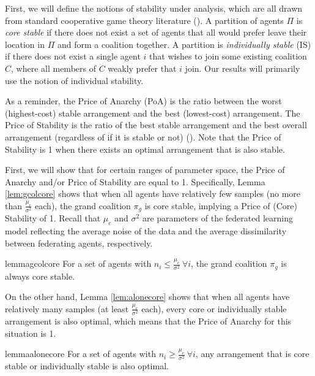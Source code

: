 \documentclass{article}
\newcommand{\mue}[0]{\ensuremath{\mu_e}}
\newcommand{\var}[0]{\ensuremath{\sigma^2}}
\newcommand{\ndraw}[0]{\ensuremath{n}}
\newcommand{\gcol}[0]{\ensuremath{\pi_g}}
\newcommand{\col}[0]{\ensuremath{C}}
\newcommand{\partition}[0]{\ensuremath{\Pi}}
\begin{document}
First, we will define the notions of stability under analysis, which are all drawn from standard cooperative game theory literature (\cite{BOGOMOLNAIA2002201}). A partition of agents $\partition$ is \emph{core stable} if there does not exist a set of agents that all would prefer leave their location in $\partition$ and form a coalition together. A partition is \emph{individually stable} (IS) if there does not exist a single agent $i$ that wishes to join some existing coalition $\col$, where all members of $\col$ weakly prefer that $i$ join. Our results will primarily use the notion of individual stability. %

As a reminder, the Price of Anarchy (PoA) is the ratio between the worst (highest-cost) stable arrangement and the best (lowest-cost) arrangement. The Price of Stability is the ratio of the best stable arrangement and the best overall arrangement (regardless of if it is stable or not) (\cite{anshelevich2008price}). Note that the Price of Stability is 1 when there exists an optimal arrangement that is also stable. 

First, we will show that for certain ranges of parameter space, the Price of Anarchy and/or Price of Stability are equal to 1. Specifically, Lemma \ref{lem:gcolcore} shows that when all agents have relatively few samples (no more than $\frac{\mue}{\var}$ each), the grand coalition $\gcol$ is core stable, implying a Price of (Core) Stability of 1. Recall that $\mue$ and $\var$ are parameters of the federated learning model reflecting the average noise of the data and the average dissimilarity between federating agents, respectively. 

\begin{restatable}{lemma}{gcolcore}
\label{lem:gcolcore}
For a set of agents with $\ndraw_i \leq \frac{\mue}{\var} \ \forall i$, the grand coalition $\gcol$ is always core stable. 
\end{restatable}

On the other hand, Lemma \ref{lem:alonecore} shows that  when all agents have relatively many samples (at least $ \frac{\mue}{\var}$ each), every core or individually stable arrangement is also optimal, which means that the Price of Anarchy for this situation is 1.  

\begin{restatable}{lemma}{alonecore}
\label{lem:alonecore}
For a set of agents with $\ndraw_i \geq \frac{\mue}{\var} \ \forall i$, any arrangement that is core stable or individually stable is also optimal. 
\end{restatable}
\end{document}
